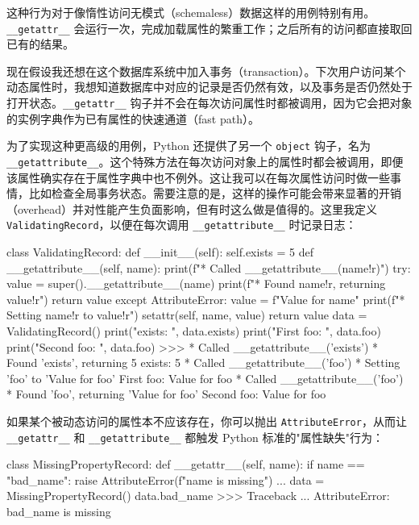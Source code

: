 这种行为对于像惰性访问无模式（schemaless）数据这样的用例特别有用。\texttt{\_\_getattr\_\_} 会运行一次，完成加载属性的繁重工作；之后所有的访问都直接取回已有的结果。

现在假设我还想在这个数据库系统中加入事务（transaction）。下次用户访问某个动态属性时，我想知道数据库中对应的记录是否仍然有效，以及事务是否仍然处于打开状态。\texttt{\_\_getattr\_\_} 钩子并不会在每次访问属性时都被调用，因为它会把对象的实例字典作为已有属性的快速通道（fast path）。

为了实现这种更高级的用例，Python 还提供了另一个 \texttt{object} 钩子，名为 \texttt{\_\_getattribute\_\_}。这个特殊方法在每次访问对象上的属性时都会被调用，即便该属性确实存在于属性字典中也不例外。这让我可以在每次属性访问时做一些事情，比如检查全局事务状态。需要注意的是，这样的操作可能会带来显著的开销（overhead）并对性能产生负面影响，但有时这么做是值得的。这里我定义 \texttt{ValidatingRecord}，以便在每次调用 \texttt{\_\_getattribute\_\_} 时记录日志：

\begin{codebox}[python]
class ValidatingRecord:
    def __init__(self):
        self.exists = 5
    def __getattribute__(self, name):
        print(f"* Called __getattribute__({name!r})")
        try:
            value = super().__getattribute__(name)
            print(f"* Found {name!r}, returning {value!r}")
            return value
        except AttributeError:
            value = f"Value for {name}"
            print(f"* Setting {name!r} to {value!r}")
            setattr(self, name, value)
            return value
data = ValidatingRecord()
print("exists:     ", data.exists)
print("First foo:  ", data.foo)
print("Second foo: ", data.foo)
>>>
* Called __getattribute__('exists')
* Found 'exists', returning 5
exists:      5
* Called __getattribute__('foo')
* Setting 'foo' to 'Value for foo'
First foo:   Value for foo
* Called __getattribute__('foo')
* Found 'foo', returning 'Value for foo'
Second foo:  Value for foo
\end{codebox}

如果某个被动态访问的属性本不应该存在，你可以抛出 \texttt{AttributeError}，从而让 \texttt{\_\_getattr\_\_} 和 \texttt{\_\_getattribute\_\_} 都触发 Python 标准的"属性缺失"行为：

\begin{codebox}[python]
class MissingPropertyRecord:
    def __getattr__(self, name):
        if name == "bad_name":
            raise AttributeError(f"{name} is missing")
        ...
data = MissingPropertyRecord()
data.bad_name
>>>
Traceback ...
AttributeError: bad_name is missing
\end{codebox}

